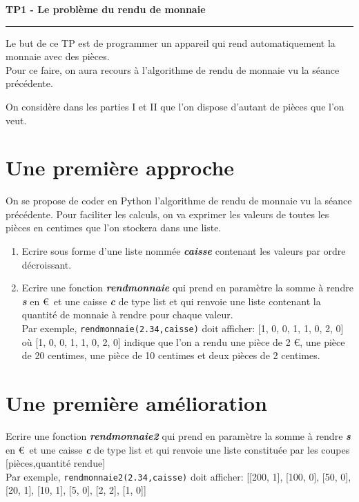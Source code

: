 \documentclass[12pt,french]{article}
\newcounter{sf}
\begin{document}
    \chead{}
      \renewcommand{\headrulewidth}{0.5pt}
      \lfoot{                      }
    \pagestyle{fancy}
    \renewcommand{\footrulewidth}{0.4pt}
\begin{center}
\textbf{\Large{TP1 - Le problème du rendu de monnaie}}\end{center}
\hrule
\medskip
\begin{center}
Le but de ce TP est de programmer un appareil qui rend automatiquement la monnaie avec des pièces. \\
Pour ce faire, on aura recours à l'algorithme de rendu de monnaie vu la séance précédente.
\end{center}
On considère dans les parties I et II que l'on dispose d'autant de pièces que l'on veut.
 
\section{Une première approche}
On se propose de coder en Python l'algorithme de rendu de monnaie vu la séance précédente. Pour faciliter les calculs, on va exprimer les valeurs de toutes les pièces en centimes que l'on stockera dans une liste.
\begin{enumerate}
	\item Ecrire sous forme d'une liste nommée \textbf{\textsl{caisse}} contenant les valeurs par ordre décroissant.
	\item Ecrire une fonction \textbf{\textsl{rendmonnaie}} qui prend en paramètre la somme à rendre \textbf{\textsl{s}} en \euro\, et une caisse \textbf{\textsl{c}} de type list et qui renvoie une liste contenant la quantité de monnaie à rendre pour chaque valeur.\\
	Par exemple,  \texttt{rendmonnaie(2.34,caisse)}
	doit afficher: [1, 0, 0, 1, 1, 0, 2, 0]\\
	où [1, 0, 0, 1, 1, 0, 2, 0] indique que l'on a rendu une pièce de 2 \euro, une pièce de 20 centimes, une pièce de 10 centimes et deux pièces de 2 centimes.
	
\end{enumerate}
\section{Une première amélioration}
 Ecrire une fonction \textbf{\textsl{rendmonnaie2}} qui prend en paramètre la somme à rendre \textbf{\textsl{s}} en \euro\, et une caisse \textbf{\textsl{c}} de type list et qui renvoie une liste constituée par les coupes [pièces,quantité rendue]\\
Par exemple,  \texttt{rendmonnaie2(2.34,caisse)}
doit afficher: [[200, 1], [100, 0], [50, 0], [20, 1], [10, 1], [5, 0], [2, 2], [1, 0]]\\
\end{document}

